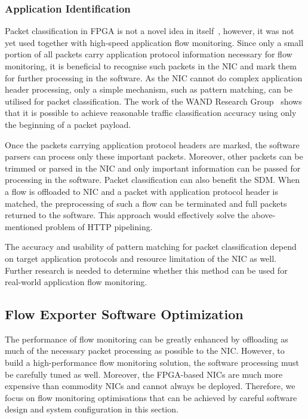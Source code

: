 \subsubsection{Application Identification}

Packet classification in FPGA is not a novel idea in itself~\cite{Song-2005-Efficient}, however, it was not yet used together with high-speed application flow monitoring. Since only a small portion of all packets carry application protocol information necessary for flow monitoring, it is beneficial to recognise such packets in the NIC and mark them for further processing in the software. As the NIC cannot do complex application header processing, only a simple mechanism, such as pattern matching, can be utilised for packet classification. The work of the WAND Research Group~\cite{Alcock-2012-libprotoident} shows that it is possible to achieve reasonable traffic classification accuracy using only the beginning of a packet payload. 

Once the packets carrying application protocol headers are marked, the software parsers can process only these important packets. Moreover, other packets can be trimmed or parsed in the NIC and only important information can be passed for processing in the software. Packet classification can also benefit the SDM. When a flow is offloaded to NIC and a packet with application protocol header is matched, the preprocessing of such a flow can be terminated and full packets returned to the software. This approach would effectively solve the above-mentioned problem of HTTP pipelining. 

The accuracy and usability of pattern matching for packet classification depend on target application protocols and resource limitation of the NIC as well. Further research is needed to determine whether this method can be used for real-world application flow monitoring.


\subsection{Flow Exporter Software Optimization}\label{sec:performance-sw-optimization}

The performance of flow monitoring can be greatly enhanced by offloading as much of the necessary packet processing as possible to the NIC. However, to build a high-performance flow monitoring solution, the software processing must be carefully tuned as well. Moreover, the FPGA-based NICs are much more expensive than commodity NICs and cannot always be deployed. Therefore, we focus on flow monitoring optimisations that can be achieved by careful software design and system configuration in this section.

